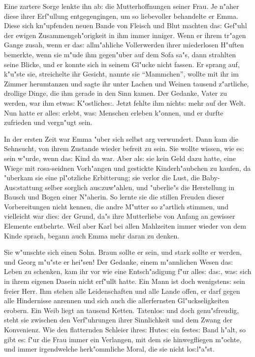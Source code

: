 \documentclass[oneside,12pt]{book}
\newcommand{\s}{s:}%
\begin{document}
Eine zartere Sorge lenkte ihn ab: die Mutterhoffnungen seiner
Frau. Je n"aher diese ihrer Erf"ullung entgegengingen, um so
liebevoller behandelte er Emma. Diese sich kn"upfenden neuen Bande
von Fleisch und Blut machten da{\s} Gef"uhl der ewigen
Zusammengeh"origkeit in ihm immer inniger. Wenn er ihrem tr"agen
Gange zusah, wenn er da{\s} allm"ahliche Vollerwerden ihrer
miederlosen H"uften bemerkte, wenn sie m"ude ihm gegen"uber auf
dem Sofa sa"s, dann strahlten seine Blicke, und er konnte sich in
seinem Gl"ucke nicht fassen. Er sprang auf, k"u"ste sie,
streichelte ihr Gesicht, nannte sie "`Mammchen"', wollte mit ihr
im Zimmer herumtanzen und sagte ihr unter Lachen und Weinen
tausend z"artliche, drollige Dinge, die ihm gerade in den Sinn
kamen. Der Gedanke, Vater zu werden, war ihm etwa{\s}
K"ostliche{\s}. Jetzt fehlte ihm nicht{\s} mehr auf der Welt. Nun
hatte er alle{\s} erlebt, wa{\s} Menschen erleben k"onnen, und er
durfte zufrieden und vergn"ugt sein.

In der ersten Zeit war Emma "uber sich selbst arg verwundert. Dann
kam die Sehnsucht, von ihrem Zustande wieder befreit zu sein. Sie
wollte wissen, wie e{\s} sein w"urde, wenn da{\s} Kind da war.
Aber al{\s} sie kein Geld dazu hatte, eine Wiege mit rosa-seidnen
Vorh"angen und gestickte Kinderh"aubchen zu kaufen, da "uberkam
sie eine pl"otzliche Erbitterung; sie verlor die Lust, die
Baby-Au{\s}stattung selber sorglich au{\s}zuw"ahlen, und
"uberlie"s die Herstellung in Bausch und Bogen einer N"aherin. So
lernte sie die stillen Freuden dieser Vorbereitungen nicht kennen,
die andre M"utter so z"artlich stimmen, und vielleicht war die{\s}
der Grund, da"s ihre Mutterliebe von Anfang an gewisser Elemente
entbehrte. Weil aber Karl bei allen Mahlzeiten immer wieder von
dem Kinde sprach, begann auch Emma mehr daran zu denken.

Sie w"unschte sich einen Sohn. Braun sollte er sein, und stark
sollte er werden, und Georg m"u"ste er hei"sen! Der Gedanke, einem
m"annlichen Wesen da{\s} Leben zu schenken, kam ihr vor wie eine
Entsch"adigung f"ur alle{\s} da{\s}, wa{\s} sich in ihrem eigenen
Dasein nicht erf"ullt hatte. Ein Mann ist doch wenigsten{\s} sein
freier Herr. Ihm stehen alle Leidenschaften und alle Lande offen,
er darf gegen alle Hindernisse anrennen und sich auch die
allerfernsten Gl"uckseligkeiten erobern. Ein Weib liegt an tausend
Ketten. Tatenlo{\s} und doch genu"sfreudig, steht sie zwischen den
Verf"uhrungen ihrer Sinnlichkeit und dem Zwang der Konvenienz. Wie
den flatternden Schleier ihre{\s} Hute{\s} ein feste{\s} Band
h"alt, so gibt e{\s} f"ur die Frau immer ein Verlangen, mit dem
sie hinwegfliegen m"ochte, und immer irgendwelche herk"ommliche
Moral, die sie nicht lo{\s}l"a"st.
\end{document}
